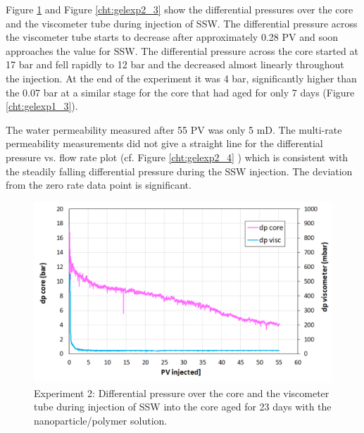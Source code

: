 Figure \ref{cht:gelexp2_2} and Figure \ref{cht:gelexp2_3} show the differential pressures over the core and the viscometer tube during injection of SSW. The differential pressure across the viscometer tube starts to decrease after approximately 0.28 PV and soon approaches the value for SSW. The differential pressure across the core started at 17 bar and fell rapidly to 12 bar and the decreased almost linearly throughout the injection. At the end of the experiment it was 4 bar, significantly higher than the 0.07 bar at a similar stage for the core that had aged for only 7 days (Figure \ref{cht:gelexp1_3}). 

The water permeability measured after 55 PV was only 5 mD. The multi-rate permeability measurements did not give a straight line for the differential pressure vs. flow rate plot (cf. Figure \ref{cht:gelexp2_4} ) which is consistent with the steadily falling differential pressure during the SSW injection. The deviation from the zero rate data point is significant.


\begin{figure}[h!]
    \centering
    \includegraphics[width=\textwidth]{img/cht/gelexp2_2.png}
    \caption{Experiment 2: Differential pressure over the core and the viscometer tube during injection of SSW into the core aged for 23 days with the nanoparticle/polymer solution.}
    \label{cht:gelexp2_2} %
\end{figure}

